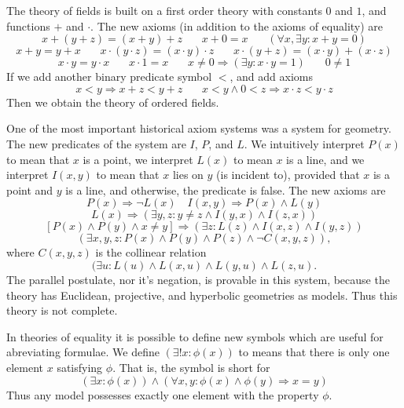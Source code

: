 \begin{example}
    The theory of fields is built on a first order theory with constants $0$ and $1$, and functions $+$ and $\cdot$. The new axioms (in addition to the axioms of equality) are
    \[ x + (y + z) = (x + y) + z\ \ \ \ \ \ \ \ x + 0 = x\ \ \ \ \ \ \ \ (\forall x, \exists y: x + y = 0) \]
    \[ x + y = y + x\ \ \ \ \ \ \ \ x \cdot (y \cdot z) = (x \cdot y) \cdot z\ \ \ \ \ \ \ \ x \cdot (y + z) = (x \cdot y) + (x \cdot z) \]
    \[ x \cdot y = y \cdot x\ \ \ \ \ \ \ \ x \cdot 1 = x\ \ \ \ \ \ \ \ x \neq 0 \Rightarrow (\exists y: x \cdot y = 1)\ \ \ \ \ \ \ \ 0 \neq 1 \]
    If we add another binary predicate symbol $<$, and add axioms
    \[ x < y \Rightarrow x + z < y + z\ \ \ \ \ \ \ \ x < y \wedge 0 < z \Rightarrow x \cdot z< y \cdot z \]
    Then we obtain the theory of ordered fields.
\end{example}

\begin{example}
    One of the most important historical axiom systems was a system for geometry. The new predicates of the system are $I$, $P$, and $L$. We intuitively interpret $P(x)$ to mean that $x$ is a point, we interpret $L(x)$ to mean $x$ is a line, and we interpret $I(x,y)$ to mean that $x$ lies on $y$ (is incident to), provided that $x$ is a point and $y$ is a line, and otherwise, the predicate is false. The new axioms are
    \[ P(x) \Rightarrow \neg L(x) \quad I(x,y) \Rightarrow P(x) \wedge L(y) \]
    \[ L(x) \Rightarrow ( \exists y,z : y \neq z \wedge I(y,x) \wedge I(z,x) ) \]
    \[ [ P(x) \wedge P(y) \wedge x \neq y ] \Rightarrow (\exists z: L(z) \wedge I(x,z) \wedge I(y,z)) \]
    \[ (\exists x,y,z: P(x) \wedge P(y) \wedge P(z) \wedge \neg C(x,y,z) ), \]
    where $C(x,y,z)$ is the collinear relation
    \[ (\exists u: L(u) \wedge L(x,u) \wedge L(y,u) \wedge L(z,u). \]
    The parallel postulate, nor it's negation, is provable in this system, because the theory has Euclidean, projective, and hyperbolic geometries as models. Thus this theory is not complete.
\end{example}

In theories of equality it is possible to define new symbols which are useful for abreviating formulae. We define $(\exists ! x: \phi(x))$ to means that there is only one element $x$ satisfying $\phi$. That is, the symbol is short for
%
\[ (\exists x: \phi(x)) \wedge (\forall x,y: \phi(x) \wedge \phi(y) \Rightarrow x = y) \]
%
Thus any model possesses exactly one element with the property $\phi$.

